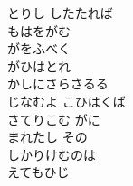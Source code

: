 \documentclass[10pt,b5j]{tarticle} %
\begin{document}
\begin{enumerate}
\begin{minipage}[c]{\blocksize}
        \vspace{\linespace}
        \item
        とりし したたれば\\
        もはをがむ\\
        がをふべく\\
        がひはとれ\\
        かしにさらさるる\\
        じなむよ こひはくば\\
        さてりこむ がに\\
        まれたし その\\
        しかりけむのは\\
        えてもひじ
    
    \end{minipage}
\end{enumerate} %
\end{document}
